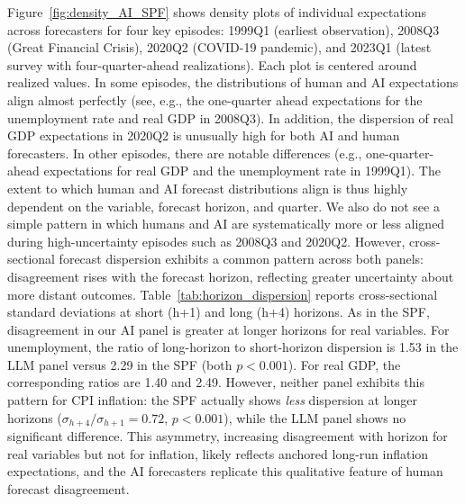 \documentclass[11pt,letterpaper]{scrartcl}
\begin{document}
Figure~\ref{fig:density_AI_SPF} shows density plots of individual expectations across forecasters for four key episodes: 1999Q1 (earliest observation), 2008Q3 (Great Financial Crisis), 2020Q2 (COVID-19 pandemic), and 2023Q1 (latest survey with four-quarter-ahead realizations). Each plot is centered around realized values. In some episodes, the distributions of human and AI expectations align almost perfectly (see, e.g., the one-quarter ahead expectations for the unemployment rate and real GDP in 2008Q3). In addition, the dispersion of real GDP expectations in 2020Q2 is unusually high for both AI and human forecasters. In other episodes, there are notable differences (e.g., one-quarter-ahead expectations for real GDP and the unemployment rate in 1999Q1). The extent to which human and AI forecast distributions align is thus highly dependent on the variable, forecast horizon, and quarter. We also do not see a simple pattern in which humans and AI are systematically more or less aligned during high-uncertainty episodes such as 2008Q3 and 2020Q2. However, cross-sectional forecast dispersion exhibits a common pattern across both panels: disagreement rises with the forecast horizon, reflecting greater uncertainty about more distant outcomes. Table~\ref{tab:horizon_dispersion} reports cross-sectional standard deviations at short (h+1) and long (h+4) horizons. As in the SPF, disagreement in our AI panel is greater at longer horizons for real variables. For unemployment, the ratio of long-horizon to short-horizon dispersion is 1.53 in the LLM panel versus 2.29 in the SPF (both $p<0.001$). For real GDP, the corresponding ratios are 1.40 and 2.49. However, neither panel exhibits this pattern for CPI inflation: the SPF actually shows \textit{less} dispersion at longer horizons ($\sigma_{h+4}/\sigma_{h+1} = 0.72$, $p<0.001$), while the LLM panel shows no significant difference. This asymmetry, increasing disagreement with horizon for real variables but not for inflation, likely reflects anchored long-run inflation expectations, and the AI forecasters replicate this qualitative feature of human forecast disagreement.

\end{document}
